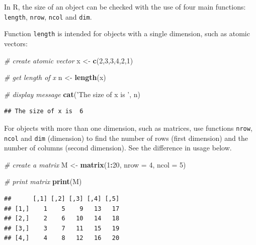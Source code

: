 \documentclass[11pt,]{book}
\newenvironment{Shaded}{\begin{snugshade}}{\end{snugshade}}
\newcommand{\KeywordTok}[1]{\textcolor[rgb]{0.27,0.27,0.27}{\textbf{#1}}}
\newcommand{\DataTypeTok}[1]{\textcolor[rgb]{0.27,0.27,0.27}{#1}}
\newcommand{\DecValTok}[1]{\textcolor[rgb]{0.06,0.06,0.06}{#1}}
\newcommand{\StringTok}[1]{\textcolor[rgb]{0.5,0.5,0.5}{#1}}
\newcommand{\CommentTok}[1]{\textcolor[rgb]{0.56,0.35,0.01}{\textit{#1}}}
\newcommand{\OperatorTok}[1]{\textcolor[rgb]{0.81,0.36,0.00}{\textbf{#1}}}
\newcommand{\NormalTok}[1]{#1}
\begin{document}
In R, the size of an object can be checked with the use of four main
functions: \texttt{length}, \texttt{nrow}, \texttt{ncol} and
\texttt{dim}.   

Function \texttt{length} is intended for objects with a single
dimension, such as atomic vectors:

\begin{Shaded}
\begin{Highlighting}[]
\CommentTok{# create atomic vector}
\NormalTok{x <-}\StringTok{ }\KeywordTok{c}\NormalTok{(}\DecValTok{2}\NormalTok{,}\DecValTok{3}\NormalTok{,}\DecValTok{3}\NormalTok{,}\DecValTok{4}\NormalTok{,}\DecValTok{2}\NormalTok{,}\DecValTok{1}\NormalTok{)}

\CommentTok{# get length of x}
\NormalTok{n <-}\StringTok{ }\KeywordTok{length}\NormalTok{(x)}

\CommentTok{# display message}
\KeywordTok{cat}\NormalTok{(}\StringTok{'The size of x is '}\NormalTok{, n)}
\end{Highlighting}
\end{Shaded}

\begin{verbatim}
## The size of x is  6
\end{verbatim}

For objects with more than one dimension, such as matrices, use
functions \texttt{nrow}, \texttt{ncol} and \texttt{dim} (dimension) to
find the number of rows (first dimension) and the number of columns
(second dimension). See the difference in usage below.

\begin{Shaded}
\begin{Highlighting}[]
\CommentTok{# create a matrix}
\NormalTok{M <-}\StringTok{ }\KeywordTok{matrix}\NormalTok{(}\DecValTok{1}\OperatorTok{:}\DecValTok{20}\NormalTok{, }\DataTypeTok{nrow =} \DecValTok{4}\NormalTok{, }\DataTypeTok{ncol =} \DecValTok{5}\NormalTok{)}

\CommentTok{# print matrix}
\KeywordTok{print}\NormalTok{(M)}
\end{Highlighting}
\end{Shaded}

\begin{verbatim}
##      [,1] [,2] [,3] [,4] [,5]
## [1,]    1    5    9   13   17
## [2,]    2    6   10   14   18
## [3,]    3    7   11   15   19
## [4,]    4    8   12   16   20
\end{verbatim}
\end{document}
